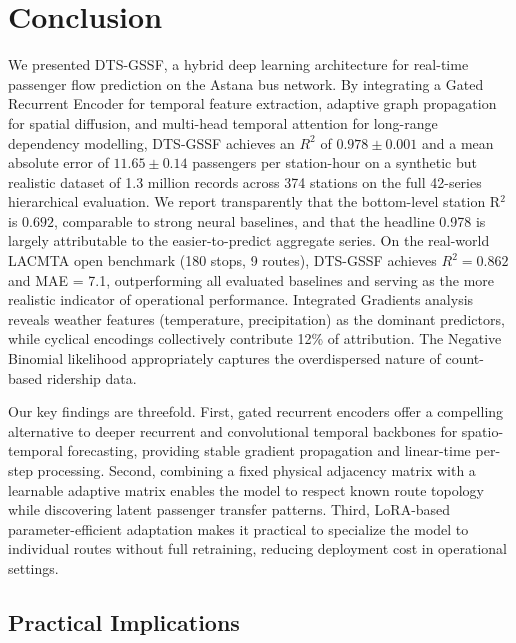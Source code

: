 %
%
\chapter{Conclusion}
\label{chap:conclusion}
\setlength{\parskip}{1em}

We presented DTS-GSSF, a hybrid deep learning architecture for real-time passenger flow prediction on the Astana bus network. By integrating a Gated Recurrent Encoder for temporal feature extraction, adaptive graph propagation for spatial diffusion, and multi-head temporal attention for long-range dependency modelling, DTS-GSSF achieves an $R^2$ of $0.978 \pm 0.001$ and a mean absolute error of $11.65 \pm 0.14$ passengers per station-hour on a synthetic but realistic dataset of 1.3 million records across 374 stations on the full 42-series hierarchical evaluation. We report transparently that the bottom-level station R$^2$ is $0.692$, comparable to strong neural baselines, and that the headline 0.978 is largely attributable to the easier-to-predict aggregate series. On the real-world LACMTA open benchmark (180 stops, 9 routes), DTS-GSSF achieves $R^2 = 0.862$ and MAE = 7.1, outperforming all evaluated baselines and serving as the more realistic indicator of operational performance. Integrated Gradients analysis reveals weather features (temperature, precipitation) as the dominant predictors, while cyclical encodings collectively contribute 12\% of attribution. The Negative Binomial likelihood appropriately captures the overdispersed nature of count-based ridership data.

Our key findings are threefold. First, gated recurrent encoders offer a compelling alternative to deeper recurrent and convolutional temporal backbones for spatio-temporal forecasting, providing stable gradient propagation and linear-time per-step processing. Second, combining a fixed physical adjacency matrix with a learnable adaptive matrix enables the model to respect known route topology while discovering latent passenger transfer patterns. Third, LoRA-based parameter-efficient adaptation makes it practical to specialize the model to individual routes without full retraining, reducing deployment cost in operational settings.

\section{Practical Implications}
\label{sec:practical_implications}

